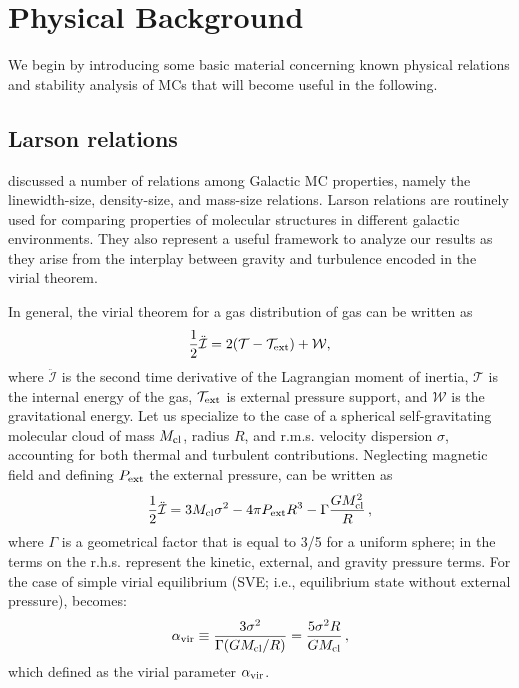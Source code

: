 \IfFileExists{emulateapjlegacy.cls}{\documentclass[iop]{emulateapjlegacy}}{\documentclass[iop]{emulateapj}}
\begin{document}
\section{Physical Background}\label{sec:Back}
We begin by introducing some basic material concerning known physical relations and stability analysis of MCs that will become useful in the following.
\subsection{Larson relations}\label{sec:PVE}
\citep{Larson81a} discussed a number of relations among Galactic MC properties, namely the linewidth-size, density-size, and mass-size relations. Larson relations are routinely used for comparing properties of molecular structures in different galactic environments. They also represent a useful framework to analyze our results as they arise from the interplay between gravity and turbulence encoded in the virial theorem. 

In general, the virial theorem for a gas distribution of gas can be written as
\begin{equation}\label{eqn:virial_th_general}
\frac{1}{2}\ddot{\mathcal{I}} = 2(\mathcal{T} - \mathcal{T}_{\rm ext}) + \mathcal{W},
\end{equation}
where $\ddot{\mathcal{I}}$ is the second time derivative of the Lagrangian moment of inertia, $\mathcal{T}$ is the internal energy of the gas, $\mathcal{T}_{\rm ext}$ is external pressure support, and $\mathcal{W}$ is the gravitational energy.
%
Let us specialize to the case of a spherical self-gravitating molecular cloud of mass $M_{\rm cl}$, radius $R$, and r.m.s. velocity dispersion $\sigma$, accounting for both thermal and turbulent contributions. Neglecting magnetic field and defining $P_{\rm ext}$ the external pressure,  can be written as
\begin{equation}
\frac{1}{2}{\ddot{\mathcal{I}}} = 3 M_{\rm cl} \sigma^2 - 4\pi P_{\rm ext} R^3 - \Gamma\frac{GM_{\rm cl}^2}{R}\,,
\label{eqn:virial}
\end{equation}
where $\Gamma$ is a geometrical factor that is equal to 3/5 for a uniform sphere; in  the terms on the r.h.s. represent the kinetic, external, and gravity pressure terms. 
%
For the case of simple virial equilibrium (SVE; i.e., equilibrium state without external pressure),  becomes:
\begin{equation}
\alpha_{\rm vir} \equiv \frac{3\sigma^2}{\Gamma (GM_{\rm cl}/R)} = \frac{5\sigma^2R}{GM_{\rm cl}}\,,
\label{eqn:alpha}
\end{equation}
which defined as the virial parameter $\alpha_{\rm vir}$.
\end{document}
